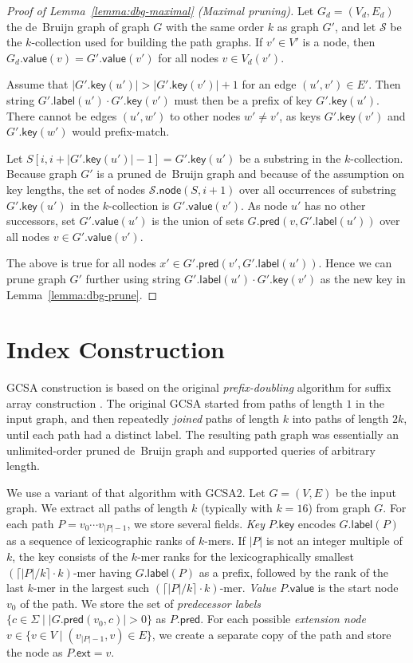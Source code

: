 \documentclass[a4paper,UKenglish]{lipics-v2016}
\newcommand{\set}[1]{\ensuremath{\{ #1 \}}}
\newcommand{\abs}[1]{\ensuremath{\lvert #1 \rvert}}
\newcommand{\glabel}{\ensuremath{\mathsf{label}}}
\newcommand{\gpred}{\ensuremath{\mathsf{pred}}}
\newcommand{\gkey}{\ensuremath{\mathsf{key}}}
\newcommand{\gvalue}{\ensuremath{\mathsf{value}}}
\newcommand{\gnode}{\ensuremath{\mathsf{node}}}
\newcommand{\gext}{\ensuremath{\mathsf{ext}}}
\newcommand{\kmer}[1]{$#1$\nobreakdash-mer}
\newcommand{\kcollection}[1]{$#1$\nobreakdash-collection}
\begin{document}
\begin{proof}[Proof of Lemma~\ref{lemma:dbg-maximal} (Maximal pruning)]
Let $G_{d} = (V_{d}, E_{d})$ the de~Bruijn graph of graph $G$ with the same order $k$ as graph $G'$, and let $\mathcal{S}$ be the \kcollection{k} used for building the path graphs. If $v' \in V'$ is a node, then $G_{d}.\gvalue(v) = G'.\gvalue(v')$ for all nodes $v \in V_{d}(v')$.

Assume that $\abs{G'.\gkey(u')} > \abs{G'.\gkey(v')}+1$ for an edge $(u', v') \in E'$. Then string $G'.\glabel(u') \cdot G'.\gkey(v')$ must then be a prefix of key $G'.\gkey(u')$. There cannot be edges $(u', w')$ to other nodes $w' \ne v'$, as keys $G'.\gkey(v')$ and $G'.\gkey(w')$ would prefix-match.

Let $S[i, i+\abs{G'.\gkey(u')}-1] = G'.\gkey(u')$ be a substring in the \kcollection{k}. Because graph $G'$ is a pruned de~Bruijn graph and because of the assumption on key lengths, the set of nodes $\mathcal{S}.\gnode(S, i+1)$ over all occurrences of substring $G'.\gkey(u')$ in the \kcollection{k} is $G'.\gvalue(v')$. As node $u'$ has no other successors, set $G'.\gvalue(u')$ is the union of sets $G.\gpred(v, G'.\glabel(u'))$ over all nodes $v \in G'.\gvalue(v')$.

The above is true for all nodes $x' \in G'.\gpred(v', G'.\glabel(u'))$. Hence we can prune graph $G'$ further using string $G'.\glabel(u') \cdot G'.\gkey(v')$ as the new key in Lemma~\ref{lemma:dbg-prune}.
\end{proof}


\section{Index Construction}\label{appendix:construction}

GCSA construction \cite{Siren2014} is based on the original \emph{prefix-doubling} algorithm for suffix array construction \cite{Manber1993}. The original GCSA started from paths of length $1$ in the input graph, and then repeatedly \emph{joined} paths of length $k$ into paths of length $2k$, until each path had a distinct label. The resulting path graph was essentially an unlimited-order pruned de~Bruijn graph and supported queries of arbitrary length.

We use a variant of that algorithm with GCSA2. Let $G = (V, E)$ be the input graph. We extract all paths of length $k$ (typically with $k = 16$) from graph $G$. For each path $P = v_{0} \dotsm v_{\abs{P}-1}$, we store several fields. \emph{Key} $P.\gkey$ encodes $G.\glabel(P)$ as a sequence of lexicographic ranks of \kmer{k}s. If $\abs{P}$ is not an integer multiple of $k$, the key consists of the \kmer{k} ranks for the lexicographically smallest \kmer{(\lceil \abs{P}/k \rceil \cdot k)} having $G.\glabel(P)$ as a prefix, followed by the rank of the last \kmer{k} in the largest such \kmer{(\lceil \abs{P}/k \rceil \cdot k)}. \emph{Value} $P.\gvalue$ is the start node $v_{0}$ of the path. We store the set of \emph{predecessor labels} $\set{c \in \Sigma \mid \abs{G.\gpred(v_{0}, c)} > 0}$ as $P.\gpred$. For each possible \emph{extension node} $v \in \set{v \in V \mid (v_{\abs{P}-1}, v) \in E}$, we create a separate copy of the path and store the node as $P.\gext = v$.
\end{document}
